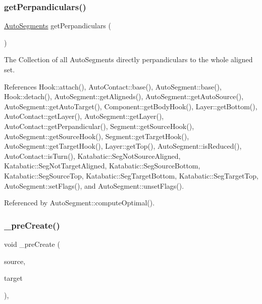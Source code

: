 \mbox{\label{classKatabatic_1_1AutoSegment_aadc6427db83ebdb690e74980d9c8d7d8}} 
\subsubsection{\texorpdfstring{get\+Perpandiculars()}{getPerpandiculars()}}
{\footnotesize\ttfamily \hyperlink{namespaceKatabatic_a2221b0ddbc24f331809fc86f98e38041}{Auto\+Segments} get\+Perpandiculars (\begin{DoxyParamCaption}{ }\end{DoxyParamCaption})}

The Collection of all Auto\+Segments directly perpandiculars to the whole aligned set. 

References Hook\+::attach(), Auto\+Contact\+::base(), Auto\+Segment\+::base(), Hook\+::detach(), Auto\+Segment\+::get\+Aligneds(), Auto\+Segment\+::get\+Auto\+Source(), Auto\+Segment\+::get\+Auto\+Target(), Component\+::get\+Body\+Hook(), Layer\+::get\+Bottom(), Auto\+Contact\+::get\+Layer(), Auto\+Segment\+::get\+Layer(), Auto\+Contact\+::get\+Perpandicular(), Segment\+::get\+Source\+Hook(), Auto\+Segment\+::get\+Source\+Hook(), Segment\+::get\+Target\+Hook(), Auto\+Segment\+::get\+Target\+Hook(), Layer\+::get\+Top(), Auto\+Segment\+::is\+Reduced(), Auto\+Contact\+::is\+Turn(), Katabatic\+::\+Seg\+Not\+Source\+Aligned, Katabatic\+::\+Seg\+Not\+Target\+Aligned, Katabatic\+::\+Seg\+Source\+Bottom, Katabatic\+::\+Seg\+Source\+Top, Katabatic\+::\+Seg\+Target\+Bottom, Katabatic\+::\+Seg\+Target\+Top, Auto\+Segment\+::set\+Flags(), and Auto\+Segment\+::unset\+Flags().



Referenced by Auto\+Segment\+::compute\+Optimal().

\mbox{\label{classKatabatic_1_1AutoSegment_a8348937b1db79480305b178482d3ed61}} 
\subsubsection{\texorpdfstring{\+\_\+pre\+Create()}{\_preCreate()}}
{\footnotesize\ttfamily void \+\_\+pre\+Create (\begin{DoxyParamCaption}\item[{\hyperlink{classKatabatic_1_1AutoContact}{Auto\+Contact} $\ast$}]{source,  }\item[{\hyperlink{classKatabatic_1_1AutoContact}{Auto\+Contact} $\ast$}]{target }\end{DoxyParamCaption})\hspace{0.3cm}{\ttfamily [static]}, {\ttfamily [protected]}}

